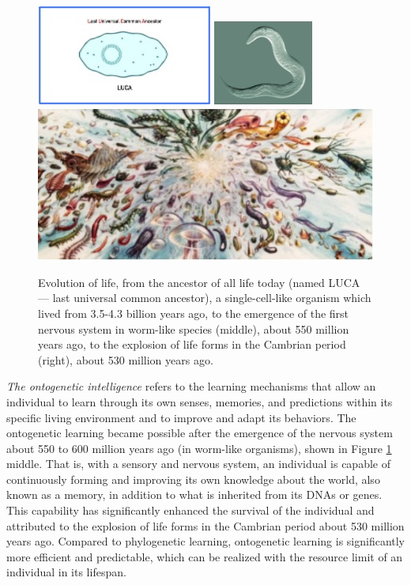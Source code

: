 \documentclass[../../book-main.tex]{subfiles}
\begin{document}
\begin{figure}
    \centering
\includegraphics[height=0.19\linewidth]{figs_chap1/Luca.jpg}
\includegraphics[height=0.19\linewidth]{figs_chap1/Worm.jpg}
\includegraphics[height=0.19\linewidth]{figs_chap1/Cambrian.jpg}
    \caption{Evolution of life, from the ancestor of all life today (named LUCA --- last universal common ancestor), a single-cell-like organism which lived from 3.5-4.3 billion years ago, to the emergence of the first nervous system in worm-like species (middle), about 550 million years ago, to the explosion of life forms in the Cambrian period (right), about 530 million years ago.}
    \label{fig:evolution}
\end{figure}

{\em The ontogenetic intelligence} refers to the learning mechanisms that allow an individual to learn through its own senses, memories, and predictions within its specific living environment and to improve and adapt its behaviors. The ontogenetic learning became possible after the emergence of the nervous system about 550 to 600 million years ago (in worm-like organisms), shown in Figure \ref{fig:evolution} middle. That is, with a sensory and nervous system, an individual is capable of continuously forming and improving its own knowledge about the world, also known as a memory, in addition to what is inherited from its DNAs or genes. This capability has significantly enhanced the survival of the individual and attributed to the explosion of life forms in the Cambrian period about 530 million years ago.  Compared to phylogenetic learning, ontogenetic learning is significantly more efficient and predictable, which can be realized with the resource limit of an individual in its lifespan.
\end{document}
